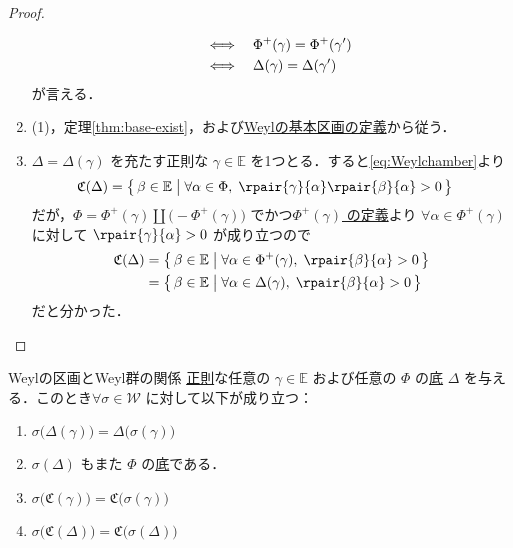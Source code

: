 \documentclass[rep_main]{subfiles}
\begin{document}
\begin{proof}
\begin{enumerate}
\begin{align}
			&\quad \Longleftrightarrow \quad \Phi^+(\gamma) = \Phi^+(\gamma') \\
			&\quad \Longleftrightarrow \quad \Delta(\gamma) = \Delta(\gamma')
		\end{align}
		が言える．
		\item (1)，定理\ref{thm:base-exist}，および\hyperref[def:Weylchamber]{Weylの基本区画の定義}から従う．
		\item $\Delta = \Delta(\gamma)$ を充たす正則な $\gamma \in \mathbb{E}$ を1つとる．すると\eqref{eq:Weylchamber}より
		\begin{align}
			\mathfrak{C}(\Delta) 
			&= \bigl\{\, \beta \in \mathbb{E} \bigm| \forall \alpha \in \Phi,\; \rpair{\gamma}{\alpha}\rpair{\beta}{\alpha} > 0 \,\bigr\}
		\end{align}
		だが，$\Phi = \Phi^+(\gamma) \amalg \bigl(-\Phi^+(\gamma)\bigr)$ でかつ\hyperref[def:decomposable]{$\Phi^+(\gamma)$ の定義}より $\forall \alpha \in \Phi^+(\gamma)$ に対して $\rpair{\gamma}{\alpha} > 0$ が成り立つので
		\begin{align}
			\mathfrak{C}(\Delta) 
			&= \bigl\{\, \beta \in \mathbb{E} \bigm| \forall \alpha \in \Phi^+(\gamma),\; \rpair{\beta}{\alpha} > 0 \,\bigr\} \\
			&= \bigl\{\, \beta \in \mathbb{E} \bigm| \forall \alpha \in \Delta(\gamma),\; \rpair{\beta}{\alpha} > 0 \,\bigr\}
		\end{align}
		だと分かった．
	\end{enumerate}
	
\end{proof}


\begin{mylem}[label=lem:Weylchamber-Weylgroup]{Weylの区画とWeyl群の関係}
	\hyperref[def:decomposable]{正則}な任意の $\gamma \in \mathbb{E}$ および任意の $\Phi$ の\hyperref[def:base-root]{底} $\Delta$ を与える．このとき$\forall \sigma \in \mathscr{W}$ に対して以下が成り立つ：
	\begin{enumerate}
		\item $\sigma\bigl(\Delta(\gamma)\bigr) = \Delta \bigl( \sigma(\gamma) \bigr)$
		\item $\sigma(\Delta)$ もまた $\Phi$ の\hyperref[def:base-root]{底}である．
		\item $\sigma \bigl( \mathfrak{C}(\gamma) \bigr) = \mathfrak{C} \bigl( \sigma(\gamma) \bigr)$
		\item $\sigma \bigl( \mathfrak{C}(\Delta) \bigr) = \mathfrak{C} \bigl( \sigma(\Delta) \bigr)$
	\end{enumerate}
\end{mylem}
\end{document}
